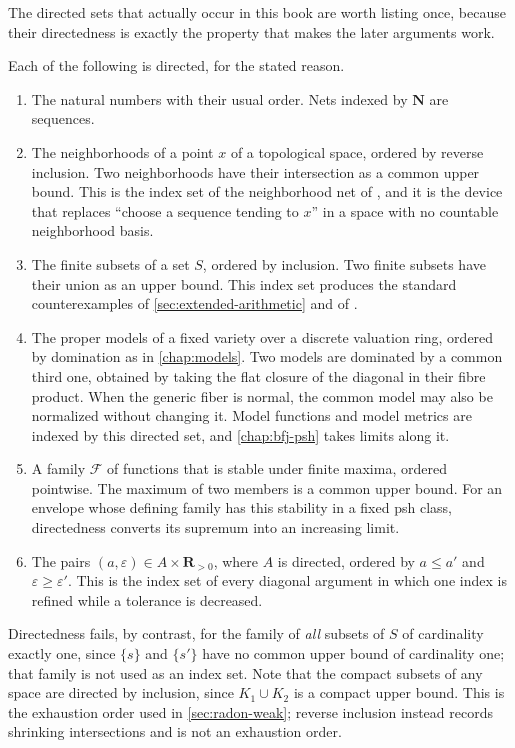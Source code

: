 The directed sets that actually occur in this book are worth listing once,
because their directedness is exactly the property that makes the later
arguments work.

\begin{example}
\label{ex:directed-sets-of-the-book}
Each of the following is directed, for the stated reason.
\begin{enumerate}
\item The natural numbers with their usual order.  Nets indexed by $\mathbf N$ are
  sequences.
\item The neighborhoods of a point $x$ of a topological space, ordered by reverse
  inclusion.  Two neighborhoods have their intersection as a common upper
  bound.  This is the index set of the neighborhood net of
  , and it is the device that replaces
  ``choose a sequence tending to $x$'' in a space with no countable
  neighborhood basis.
\item The finite subsets of a set $S$, ordered by inclusion.  Two finite subsets
  have their union as an upper bound.  This index set produces the standard
  counterexamples of \cref{sec:extended-arithmetic} and of
  .
\item The proper models of a fixed variety over a discrete valuation ring, ordered by domination
  as in \cref{chap:models}.  Two models are dominated by a common third one,
  obtained by taking the flat closure of the diagonal in their fibre product.
  When the generic fiber is normal, the common model may also be normalized
  without changing it.
  Model functions and model metrics are indexed by this directed set, and
  \cref{chap:bfj-psh} takes limits along it.
\item A family $\mathcal F$ of functions that is stable under finite maxima,
  ordered pointwise.  The maximum of two members is a common upper bound.
  For an envelope whose defining family has this stability in a fixed psh
  class, directedness converts its supremum into an increasing limit.
\item The pairs $(a,\varepsilon)\in A\times\mathbf R_{>0}$, where $A$ is directed,
  ordered by $a\leq a'$ and $\varepsilon\geq\varepsilon'$.  This is the index
  set of every diagonal argument in which one index is refined while a
  tolerance is decreased.
\end{enumerate}
Directedness fails, by contrast, for the family of \emph{all} subsets of $S$
of cardinality exactly one, since $\{s\}$ and $\{s'\}$ have no common upper
bound of cardinality one; that family is not used as an index set.  Note
that the compact subsets of any space are directed by inclusion, since
$K_1\cup K_2$ is a compact upper bound.  This is the exhaustion order used
in \cref{sec:radon-weak}; reverse inclusion instead records shrinking
intersections and is not an exhaustion order.
\end{example}

